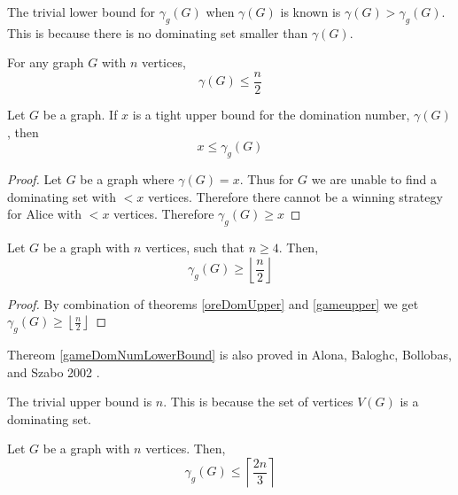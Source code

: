     The trivial lower bound for $\gamma_g(G)$ when $\gamma(G)$ is known is $\gamma(G) > \gamma_g(G)$. This is because there is no dominating set smaller than $\gamma(G)$. 
    
\begin{theorem} \label{oreDomUpper} 
    For any graph $G$ with $n$ vertices,     
    \[\gamma(G) \leq \frac{n}{2}\]
\end{theorem}


\begin{theorem}\label{gameupper}
    Let $G$ be a graph. If $x$ is a tight upper bound for the domination number, $\gamma(G)$, then      
    \[x \leq  \gamma_g(G)\]
\end{theorem}

\begin{proof}
    Let $G$ be a graph where $\gamma(G) = x$.
    Thus for $G$ we are unable to find a dominating set with $ < x$ vertices.
    Therefore there cannot be a winning strategy for Alice with $< x$ vertices.
    Therefore $\gamma_g(G) \geq x$
\end{proof}


\begin{theorem} \label{gameDomNumLowerBound}
    Let $G$ be a graph with $n$ vertices, such that $n \geq 4$. Then,    
    \[ \gamma_g(G) \geq \left \lfloor{\frac{n}{2}}\right \rfloor \]
    
\end{theorem}

\begin{proof}
    By combination of theorems \ref{oreDomUpper} and \ref{gameupper} we get  $ \gamma_g(G) \geq \left \lfloor{\frac{n}{2}}\right \rfloor $
\end{proof}

Thereom \ref{gameDomNumLowerBound} is also proved in Alona, Baloghc, Bollobas, and Szabo 2002 \cite{AlBABoSz2002}.

The trivial upper bound is $n$. This is because the set of vertices $V(G)$ is a dominating set.

\begin{theorem}
    Let $G$ be a graph with $n$ vertices. Then,    
    \[ \gamma_g(G) \leq \left\lceil \frac{2n}{3} \right\rceil\]
\end{theorem}
 
